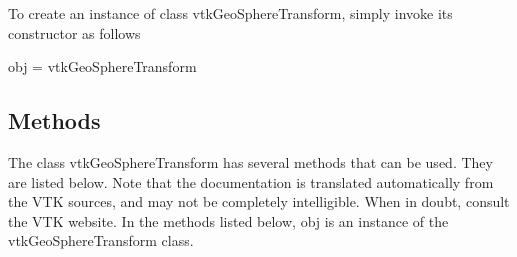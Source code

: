 To create an instance of class vtk\-Geo\-Sphere\-Transform, simply invoke its constructor as follows \begin{DoxyVerb}  obj = vtkGeoSphereTransform
\end{DoxyVerb}
 \hypertarget{vtkwidgets_vtkxyplotwidget_Methods}{}\subsection{Methods}\label{vtkwidgets_vtkxyplotwidget_Methods}
The class vtk\-Geo\-Sphere\-Transform has several methods that can be used. They are listed below. Note that the documentation is translated automatically from the V\-T\-K sources, and may not be completely intelligible. When in doubt, consult the V\-T\-K website. In the methods listed below, {\ttfamily obj} is an instance of the vtk\-Geo\-Sphere\-Transform class. 
